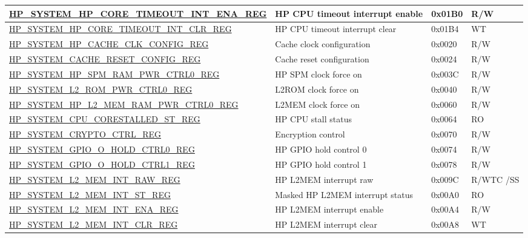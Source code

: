 \begin{longtable}{ | L{8.5cm} | L{6cm} | l | L{1.2cm} | }
\hyperref[regdesc:HPSYSTEMHPCORETIMEOUTINTENAREG]{HP\_SYSTEM\_HP\_CORE\_TIMEOUT\_INT\_ENA\_REG} & HP CPU timeout interrupt enable & 0x01B0 & R/W \\ \hline
\hyperref[regdesc:HPSYSTEMHPCORETIMEOUTINTCLRREG]{HP\_SYSTEM\_HP\_CORE\_TIMEOUT\_INT\_CLR\_REG} & HP CPU timeout interrupt clear & 0x01B4 & WT \\ \hline
\hyperref[regdesc:HPSYSTEMHPCACHECLKCONFIGREG]{HP\_SYSTEM\_HP\_CACHE\_CLK\_CONFIG\_REG} & Cache clock configuration & 0x0020 & R/W \\ \hline
\hyperref[regdesc:HPSYSTEMCACHERESETCONFIGREG]{HP\_SYSTEM\_CACHE\_RESET\_CONFIG\_REG} & Cache reset configuration & 0x0024 & R/W \\ \hline
\hyperref[regdesc:HPSYSTEMHPSPMRAMPWRCTRL0REG]{HP\_SYSTEM\_HP\_SPM\_RAM\_PWR\_CTRL0\_REG} & HP SPM clock force on & 0x003C & R/W \\ \hline
\hyperref[regdesc:HPSYSTEML2ROMPWRCTRL0REG]{HP\_SYSTEM\_L2\_ROM\_PWR\_CTRL0\_REG} & L2ROM clock force on & 0x0040 & R/W \\ \hline
\hyperref[regdesc:HPSYSTEMHPL2MEMRAMPWRCTRL0REG]{HP\_SYSTEM\_HP\_L2\_MEM\_RAM\_PWR\_CTRL0\_REG} & L2MEM clock force on & 0x0060 & R/W \\ \hline
\hyperref[regdesc:HPSYSTEMCPUCORESTALLEDSTREG]{HP\_SYSTEM\_CPU\_CORESTALLED\_ST\_REG} & HP CPU stall status & 0x0064 & RO \\ \hline
\hyperref[regdesc:HPSYSTEMCRYPTOCTRLREG]{HP\_SYSTEM\_CRYPTO\_CTRL\_REG} & Encryption control & 0x0070 & R/W \\ \hline
\hyperref[regdesc:HPSYSTEMGPIOOHOLDCTRL0REG]{HP\_SYSTEM\_GPIO\_O\_HOLD\_CTRL0\_REG} & HP GPIO hold control 0 & 0x0074 & R/W \\ \hline
\hyperref[regdesc:HPSYSTEMGPIOOHOLDCTRL1REG]{HP\_SYSTEM\_GPIO\_O\_HOLD\_CTRL1\_REG} & HP GPIO hold control 1 & 0x0078 & R/W \\ \hline
\hyperref[regdesc:HPSYSTEML2MEMINTRAWREG]{HP\_SYSTEM\_L2\_MEM\_INT\_RAW\_REG} & HP L2MEM interrupt raw & 0x009C & R/WTC /SS \\ \hline
\hyperref[regdesc:HPSYSTEML2MEMINTSTREG]{HP\_SYSTEM\_L2\_MEM\_INT\_ST\_REG} & Masked HP L2MEM interrupt status & 0x00A0 & RO \\ \hline
\hyperref[regdesc:HPSYSTEML2MEMINTENAREG]{HP\_SYSTEM\_L2\_MEM\_INT\_ENA\_REG} & HP L2MEM interrupt enable & 0x00A4 & R/W \\ \hline
\hyperref[regdesc:HPSYSTEML2MEMINTCLRREG]{HP\_SYSTEM\_L2\_MEM\_INT\_CLR\_REG} & HP L2MEM interrupt clear & 0x00A8 & WT \\ \hline

\end{longtable}
